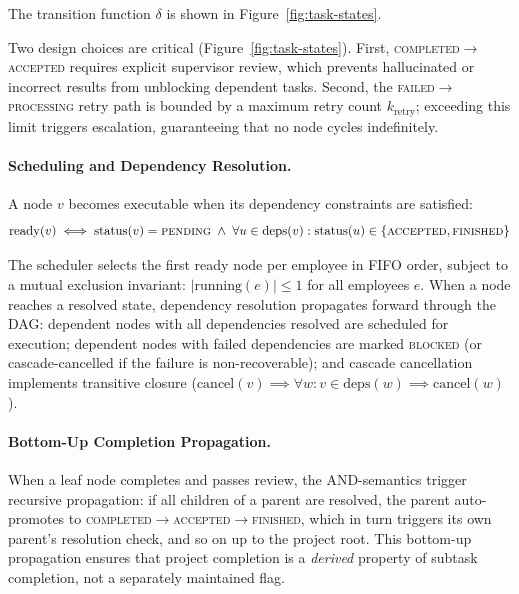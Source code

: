 \documentclass[11pt,a4paper]{article}
\begin{document}
The transition function $\delta$ is shown in Figure~\ref{fig:task-states}.



Two design choices are critical (Figure~\ref{fig:task-states}). First, \textsc{completed}$\to$\textsc{accepted} requires explicit supervisor review, which prevents hallucinated or incorrect results from unblocking dependent tasks. Second, the \textsc{failed}$\to$\textsc{processing} retry path is bounded by a maximum retry count $k_{\text{retry}}$; exceeding this limit triggers escalation, guaranteeing that no node cycles indefinitely.

\paragraph{Scheduling and Dependency Resolution.} A node $v$ becomes executable when its dependency constraints are satisfied:
\begin{equation}
\text{ready}(v) \iff \text{status}(v) = \textsc{pending} \;\wedge\; \forall u \in \text{deps}(v) : \text{status}(u) \in \{\textsc{accepted}, \textsc{finished}\}
\end{equation}

The scheduler selects the first ready node per employee in FIFO order, subject to a mutual exclusion invariant: $|\text{running}(e)| \leq 1$ for all employees $e$.  When a node reaches a resolved state, dependency resolution propagates forward through the DAG: dependent nodes with all dependencies resolved are scheduled for execution; dependent nodes with failed dependencies are marked \textsc{blocked} (or cascade-cancelled if the failure is non-recoverable); and cascade cancellation implements transitive closure ($\text{cancel}(v) \implies \forall w : v \in \text{deps}(w) \implies \text{cancel}(w)$).

\paragraph{Bottom-Up Completion Propagation.}

When a leaf node completes and passes review, the AND-semantics trigger recursive propagation: if all children of a parent are resolved, the parent auto-promotes to \textsc{completed}$\to$\textsc{accepted}$\to$\textsc{finished}, which in turn triggers its own parent’s resolution check, and so on up to the project root. This bottom-up propagation ensures that project completion is a \emph{derived} property of subtask completion, not a separately maintained flag.
\end{document}
